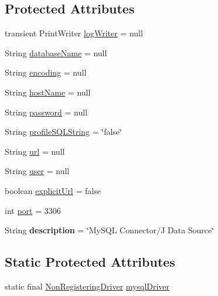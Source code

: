 \subsection*{Protected Attributes}
\begin{DoxyCompactItemize}
\item 
transient Print\+Writer \mbox{\hyperlink{classcom_1_1mysql_1_1cj_1_1jdbc_1_1_mysql_data_source_aed97ebeccb42b70af74e694fd9b2fc6b}{log\+Writer}} = null
\item 
String \mbox{\hyperlink{classcom_1_1mysql_1_1cj_1_1jdbc_1_1_mysql_data_source_a033e1f8834e4452b6875af6824350566}{database\+Name}} = null
\item 
String \mbox{\hyperlink{classcom_1_1mysql_1_1cj_1_1jdbc_1_1_mysql_data_source_abc5d2e11dc386165230580da367fbfc3}{encoding}} = null
\item 
String \mbox{\hyperlink{classcom_1_1mysql_1_1cj_1_1jdbc_1_1_mysql_data_source_af9a0b6519762e254224dd6573db12226}{host\+Name}} = null
\item 
String \mbox{\hyperlink{classcom_1_1mysql_1_1cj_1_1jdbc_1_1_mysql_data_source_a4fa203c75e6a5ecc3671e86c42ce95f5}{password}} = null
\item 
String \mbox{\hyperlink{classcom_1_1mysql_1_1cj_1_1jdbc_1_1_mysql_data_source_aef3ae80bdc336a91cfe4e03bd9046384}{profile\+S\+Q\+L\+String}} = \char`\"{}false\char`\"{}
\item 
String \mbox{\hyperlink{classcom_1_1mysql_1_1cj_1_1jdbc_1_1_mysql_data_source_a3e7b4dc2d4ae64f960ee5970a60112b3}{url}} = null
\item 
String \mbox{\hyperlink{classcom_1_1mysql_1_1cj_1_1jdbc_1_1_mysql_data_source_ac4bb1de22b71046ca05c46ec7b2769b9}{user}} = null
\item 
boolean \mbox{\hyperlink{classcom_1_1mysql_1_1cj_1_1jdbc_1_1_mysql_data_source_a05519771d81bbe9ab579496d40d5e124}{explicit\+Url}} = false
\item 
int \mbox{\hyperlink{classcom_1_1mysql_1_1cj_1_1jdbc_1_1_mysql_data_source_a1a2c2456d00300c3d2adcca6b909fd2e}{port}} = 3306
\item 
\mbox{\label{classcom_1_1mysql_1_1cj_1_1jdbc_1_1_mysql_data_source_ab0a09fe617af72b91e4419eb5d5960b8}} 
String {\bfseries description} = \char`\"{}My\+S\+QL Connector/J Data Source\char`\"{}
\end{DoxyCompactItemize}
\subsection*{Static Protected Attributes}
\begin{DoxyCompactItemize}
\item 
static final \mbox{\hyperlink{classcom_1_1mysql_1_1cj_1_1jdbc_1_1_non_registering_driver}{Non\+Registering\+Driver}} \mbox{\hyperlink{classcom_1_1mysql_1_1cj_1_1jdbc_1_1_mysql_data_source_a287608ee7b6fcd286ac73046ca9cca63}{mysql\+Driver}}
\end{DoxyCompactItemize}


